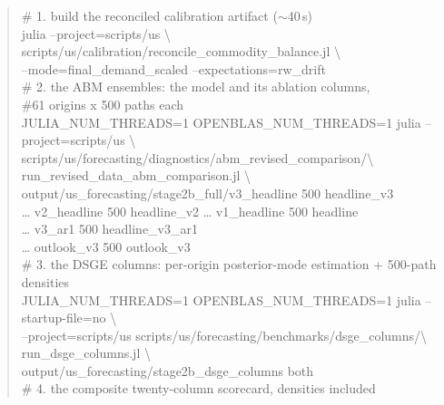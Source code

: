 \documentclass[11pt,a4paper]{article}
\begin{document}
\begin{quote}\footnotesize\ttfamily
\# 1. build the reconciled calibration artifact ($\sim$40\,s)\\
julia --project=scripts/us \textbackslash\\
\hspace*{2em}scripts/us/calibration/reconcile\_commodity\_balance.jl \textbackslash\\
\hspace*{2em}--mode=final\_demand\_scaled --expectations=rw\_drift\\[4pt]
\# 2. the ABM ensembles: the model and its ablation columns,\\
\#\hspace*{1em}61 origins x 500 paths each\\
JULIA\_NUM\_THREADS=1 OPENBLAS\_NUM\_THREADS=1 julia --project=scripts/us \textbackslash\\
\hspace*{2em}scripts/us/forecasting/diagnostics/abm\_revised\_comparison/\textbackslash\\
\hspace*{2em}run\_revised\_data\_abm\_comparison.jl \textbackslash\\
\hspace*{2em}output/us\_forecasting/stage2b\_full/v3\_headline 500 headline\_v3\\
\hspace*{2em}\ldots{} v2\_headline 500 headline\_v2 \quad\ldots{} v1\_headline 500 headline\\
\hspace*{2em}\ldots{} v3\_ar1 500 headline\_v3\_ar1\\
\hspace*{2em}\ldots{} outlook\_v3 500 outlook\_v3\\[4pt]
\# 3. the DSGE columns: per-origin posterior-mode estimation + 500-path densities\\
JULIA\_NUM\_THREADS=1 OPENBLAS\_NUM\_THREADS=1 julia --startup-file=no \textbackslash\\
\hspace*{2em}--project=scripts/us scripts/us/forecasting/benchmarks/dsge\_columns/\textbackslash\\
\hspace*{2em}run\_dsge\_columns.jl \textbackslash\\
\hspace*{2em}output/us\_forecasting/stage2b\_dsge\_columns both\\[4pt]
\# 4. the composite twenty-column scorecard, densities included\\

\end{quote}
\end{document}
